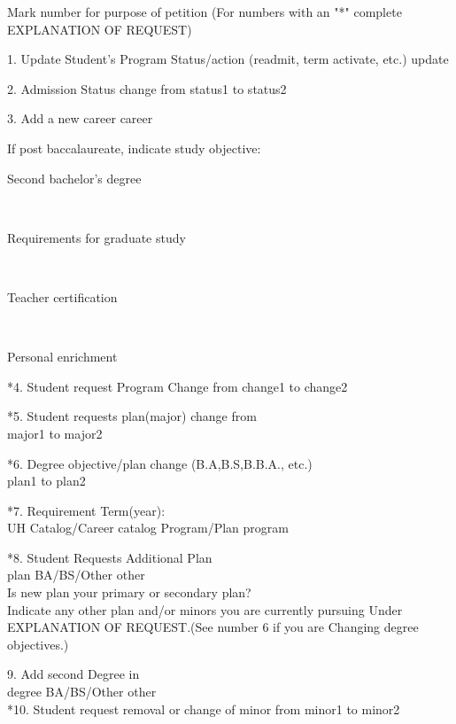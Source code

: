 \documentclass{article}
\begin{document}
\begin{Form}
Mark number for purpose of petition (For numbers with an "*" complete EXPLANATION OF REQUEST)

\begin{multicols}{3}

\parbox{.9\columnwidth}{
1. Update Student's Program Status/action (readmit, term activate, etc.) {{ update }}

2. Admission Status change from {{ status1 }} to {{ status2 }}

3. Add a new career {{ career }}

\hspace{0.5cm}If post baccalaureate, indicate study objective:
\parbox{9cm}{\hspace{1cm}Second bachelor's degree} \\
\parbox{9cm}{\hspace{1cm}Requirements for graduate study} \\
\parbox{9cm}{\hspace{1cm}Teacher certification} \\
\parbox{9cm}{\hspace{1cm}Personal enrichment}

*4. Student request Program Change from {{ change1 }} to {{ change2 }}
}

\columnbreak
\parbox{0.9\columnwidth}{
*5. Student requests plan(major) change from \\ {{ major1 }} to {{ major2 }}

*6. Degree objective/plan change (B.A,B.S,B.B.A., etc.) \\ {{ plan1 }} to {{ plan2 }}

*7. Requirement Term(year): \\
UH Catalog/Career {{ catalog }} Program/Plan {{ program }}

*8. Student Requests Additional Plan \\
{{ plan }} BA/BS/Other {{ other }} \\
Is new plan your primary or secondary plan? \\
\scriptsize Indicate any other plan and/or minors you are currently pursuing Under EXPLANATION OF REQUEST.(See number 6 if you are Changing degree objectives.)
}

\columnbreak
\parbox{0.8\columnwidth}{
9. Add second Degree in \\
{{ degree }} BA/BS/Other {{ other }} \\

*10. Student request removal or change of minor from {{ minor1 }} to {{ minor2 }} \\

}
\end{multicols}
\end{Form}
\end{document}
